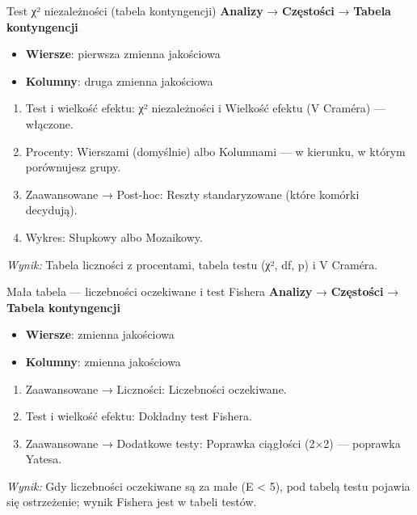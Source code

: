 \documentclass[
  polish,
  10pt,
  a4paper,
  DIV=11,
  numbers=noendperiod]{scrartcl}
\newcommand{\jmenu}[1]{{\color{upwraccent}\small #1}}
\begin{document}
\begin{jbox}{Test χ² niezależności (tabela kontyngencji)}\label{w:chi2-niezaleznosc}
\jmenu{\textbf{Analizy} → \textbf{Częstości} → \textbf{Tabela kontyngencji}}

\begin{itemize}
\item[$\triangleright$] \textbf{Wiersze}: pierwsza zmienna jakościowa
\item[$\triangleright$] \textbf{Kolumny}: druga zmienna jakościowa
\end{itemize}
\begin{enumerate}
\item Test i wielkość efektu: χ² niezależności i Wielkość efektu (V Craméra) — włączone.
\item Procenty: Wierszami (domyślnie) albo Kolumnami — w kierunku, w którym porównujesz grupy.
\item Zaawansowane → Post-hoc: Reszty standaryzowane (które komórki decydują).
\item Wykres: Słupkowy albo Mozaikowy.
\end{enumerate}
\textit{Wynik:} Tabela liczności z procentami, tabela testu (χ², df, p) i V Craméra.

\end{jbox}

\begin{jbox}{Mała tabela — liczebności oczekiwane i test Fishera}\label{w:fisher}
\jmenu{\textbf{Analizy} → \textbf{Częstości} → \textbf{Tabela kontyngencji}}

\begin{itemize}
\item[$\triangleright$] \textbf{Wiersze}: zmienna jakościowa
\item[$\triangleright$] \textbf{Kolumny}: zmienna jakościowa
\end{itemize}
\begin{enumerate}
\item Zaawansowane → Liczności: Liczebności oczekiwane.
\item Test i wielkość efektu: Dokładny test Fishera.
\item Zaawansowane → Dodatkowe testy: Poprawka ciągłości (2×2) — poprawka Yatesa.
\end{enumerate}
\textit{Wynik:} Gdy liczebności oczekiwane są za małe (E \textless{} 5), pod tabelą testu pojawia się ostrzeżenie; wynik Fishera jest w tabeli testów.

\end{jbox}
\end{document}
